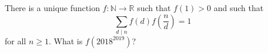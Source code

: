 There is a unique function $f:\mathbb{N}\to\mathbb{R}$ such that $f\left(1\right)>0$ and such that \[\displaystyle\sum_{d\mid n}f\left(d\right)f\left(\frac{n}{d}\right)=1\] for all $n\geq1$. What is $f\left(2018^{2019}\right)$?
